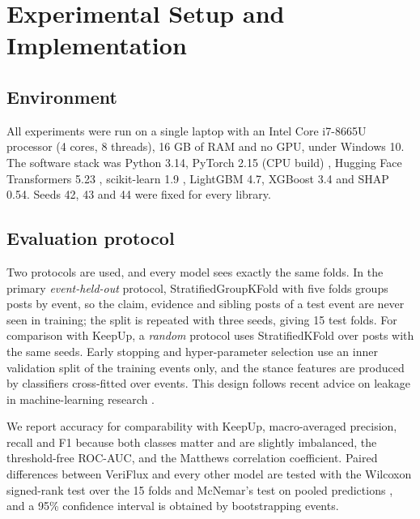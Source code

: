 \documentclass[conference]{IEEEtran}
\begin{document}
\section{Experimental Setup and Implementation}
\label{sec:setup}
\subsection{Environment}
All experiments were run on a single laptop with an Intel Core i7-8665U processor (4 cores, 8 threads), 16 GB
of RAM and no GPU, under Windows 10. The software stack was Python 3.14, PyTorch 2.15 (CPU build)
\cite{paszke2019pytorch}, Hugging Face Transformers 5.23 \cite{wolf2020transformers}, scikit-learn 1.9
\cite{pedregosa2011sklearn}, LightGBM 4.7, XGBoost 3.4 \cite{chen2016xgboost} and SHAP 0.54. Seeds 42, 43 and 44
were fixed for every library.

\subsection{Evaluation protocol}
Two protocols are used, and every model sees exactly the same folds. In the primary \emph{event-held-out}
protocol, StratifiedGroupKFold with five folds groups posts by event, so the claim, evidence and sibling posts of
a test event are never seen in training; the split is repeated with three seeds, giving 15 test folds. For
comparison with KeepUp, a \emph{random} protocol uses StratifiedKFold over posts with the same seeds. Early
stopping and hyper-parameter selection use an inner validation split of the training events only, and the
stance features are produced by classifiers cross-fitted over events. This design follows recent advice on
leakage in machine-learning research \cite{kapoor2023leakage}.

We report accuracy for comparability with KeepUp, macro-averaged precision, recall and F1 because both classes
matter and are slightly imbalanced, the threshold-free ROC-AUC, and the Matthews correlation coefficient. Paired
differences between VeriFlux and every other model are tested with the Wilcoxon signed-rank test over the 15
folds \cite{demsar2006statistical} and McNemar's test on pooled predictions \cite{mcnemar1947}, and a 95\%
confidence interval is obtained by bootstrapping events.
\end{document}
